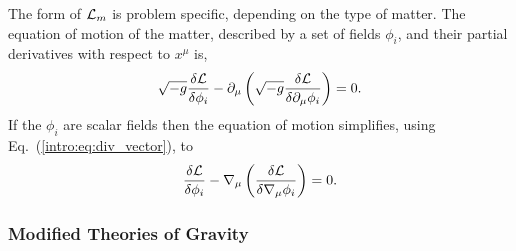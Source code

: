 The form of $\mathcal{L}_m$ is problem specific, depending on the type of matter. The equation of motion of the matter, described by a set of fields $\phi_i$, and their partial derivatives with respect to $x^\mu$ is,
\begin{equation}
\sqrt{-g}\frac{\delta \mathcal{L}}{\delta \phi_i} -\partial_\mu \left(\sqrt{-g}\frac{\delta\mathcal{L}}{\delta \partial_\mu \phi_i}\right)=0.
\end{equation}
If the $\phi_i$ are scalar fields then the equation of motion simplifies, using Eq.~(\ref{intro:eq:div_vector}), to
\begin{equation}
\frac{\delta \mathcal{L}}{\delta \phi_i} - \nabla_\mu \left(\frac{\delta\mathcal{L}}{\delta \nabla_\mu \phi_i}\right)=0.
\end{equation}

\subsubsection*{Modified Theories of Gravity}



